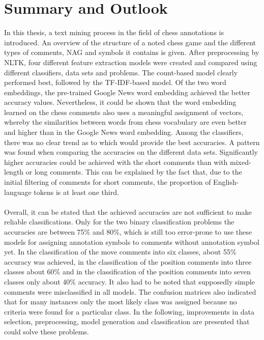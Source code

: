 \documentclass[article,type=msc,colorback,accentcolor=tud7b]{tudthesis}
\begin{document}
  \section{Summary and Outlook}
    In this thesis, a text mining process in the field of chess annotations is introduced. An overview of the structure of a noted chess game and the different types of comments, NAG and symbols it contains is given. After preprocessing by NLTK, four different feature extraction models were created and compared using different classifiers, data sets and problems. The count-based model clearly performed best, followed by the TF-IDF-based model. Of the two word embeddings, the pre-trained Google News word embedding achieved the better accuracy values. Nevertheless, it could be shown that the word embedding learned on the chess comments also uses a meaningful assignment of vectors, whereby the similarities between words from chess vocabulary are even better and higher than in the Google News word embedding. Among the classifiers, there was no clear trend as to which would provide the best accuracies. A pattern was found when comparing the accuracies on the different data sets. Significantly higher accuracies could be achieved with the short comments than with mixed-length or long comments. This can be explained by the fact that, due to the initial filtering of comments for short comments, the proportion of English-language tokens is at least one third. \\\\
    Overall, it can be stated that the achieved accuracies are not sufficient to make reliable classifications. Only for the two binary classification problems the accuracies are between 75\% and 80\%, which is still too error-prone to use these models for assigning annotation symbols to comments without annotation symbol yet. In the classification of the move comments into six classes, about 55\% accuracy was achieved, in the classification of the position comments into three classes about 60\% and in the classification of the position comments into seven classes only about 40\% accuracy. It also had to be noted that supposedly simple comments were misclassified in all models. The confusion matrices also indicated that for many instances only the most likely class was assigned because no criteria were found for a particular class. In the following, improvements in data selection, preprocessing, model generation and classification are presented that could solve these problems. \\\\
\end{document}
